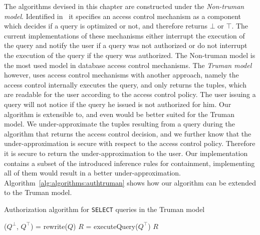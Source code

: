 The algorithms devised in this chapter are constructed under the \emph{Non-truman model}.
%
Identified in~\citep{rizvi2004extending} it specifies an access control mechanism as a component which decides if a query is optimized or not, and therefore returns $\bot$ or $\top$.
%
The current implementations of these mechanisms either interrupt the execution of the query and notify the user if a query was not authorized or do not interrupt the execution of the query if the query was authorized.
%
The Non-truman model is the most used model in database access control mechanisms.
%
The \emph{Truman model} however, uses access control mechanisms with another approach, namely the access control internally executes the query, and only returns the tuples, which are readable for the user according to the access control policy.
%
The user issuing a query will not notice if the query he issued is not authorized for him.
%
Our algorithm is extensible to, and even would be better suited for the Truman model.
%
We under-approximate the tuples resulting from a query during the algorithm that returns the access control decision, and we further know that the under-approximation is secure with respect to the access control policy.
%
Therefore it is secure to return the under-approximation to the user.
%
Our implementation contains a subset of the introduced inference rules for containment, implementing all of them would result in a better under-approximation.
%
Algorithm~\ref{alg:algorithms:authtruman} shows how our algorithm can be extended to the Truman model.
%
\begin{algorithm}
\caption{Authorization algorithm for \texttt{SELECT} queries in the Truman model}
\label{alg:algorithms:authtruman}
	\SetAlgoLined
	($Q^\bot$, $Q^\top$) = rewrite($Q$)\;
	$R$ = executeQuery($Q^\top$)\;
	\Return $R$
\end{algorithm}